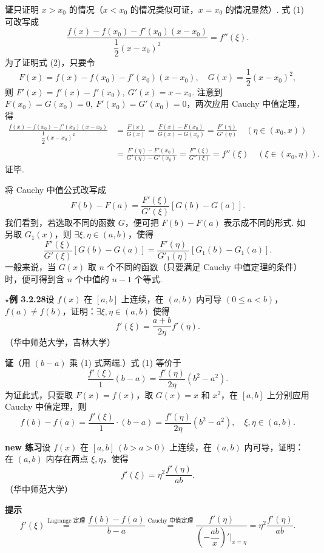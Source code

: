 \documentclass[UTF8, 12pt, fontset=fandol, oneside]{ctexart}
\begin{document}
\noindent\textbf{证}\quad 只证明 $x>x_0$ 的情况（$x<x_0$ 的情况类似可证，$x=x_0$ 的情况显然）. 式 (1) 可改写成
\begin{equation}
  \frac{f(x)-f(x_0)-f'(x_0)(x-x_0)}
  {\dfrac12(x-x_0)^2}=f''(\xi).
\tag{2}
\end{equation}
为了证明式 (2)，只要令
\[
  F(x)=f(x)-f(x_0)-f'(x_0)(x-x_0),\quad
  G(x)=\frac12(x-x_0)^2,
\]
则 $F'(x)=f'(x)-f'(x_0),\ G'(x)=x-x_0$.
注意到 $F(x_0)=G(x_0)=0,\ F'(x_0)=G'(x_0)=0$，两次应用 Cauchy 中值定理，得
\[
\begin{aligned}
\frac{f(x)-f(x_0)-f'(x_0)(x-x_0)}
{\dfrac12(x-x_0)^2}
&=\frac{F(x)}{G(x)}
=\frac{F(x)-F(x_0)}{G(x)-G(x_0)}
=\frac{F'(\eta)}{G'(\eta)}\quad(\eta\in(x_0,x))\\
&=\frac{F'(\eta)-F'(x_0)}{G'(\eta)-G'(x_0)}
=\frac{F''(\xi)}{G''(\xi)}
=f''(\xi)\quad(\xi\in(x_0,\eta)).
\end{aligned}
\]
证毕.

将 Cauchy 中值公式改写成
\[
  F(b)-F(a)=\frac{F'(\xi)}{G'(\xi)}[G(b)-G(a)].
\]
我们看到，若选取不同的函数 $G$，便可把 $F(b)-F(a)$ 表示成不同的形式. 如另取 $G_1(x)$，则 $\exists\xi,\eta\in(a,b)$，使得
\[
  \frac{F'(\xi)}{G'(\xi)}[G(b)-G(a)]
  =
  \frac{F'(\eta)}{G'_1(\eta)}[G_1(b)-G_1(a)].
\]
一般来说，当 $G(x)$ 取 $n$ 个不同的函数（只要满足 Cauchy 中值定理的条件）时，便可得到含 $n$ 个中值的 $n-1$ 个等式.

\noindent\textbf{$\star$例 3.2.28}\quad 设 $f(x)$ 在 $[a,b]$ 上连续，在 $(a,b)$ 内可导 $(0\le a<b)$，$f(a)\ne f(b)$，证明：$\exists\xi,\eta\in(a,b)$ 使得
\begin{equation}
  f'(\xi)=\frac{a+b}{2\eta}f'(\eta).
\tag{1}
\end{equation}
（华中师范大学，吉林大学）

\noindent\textbf{证}\quad （用 $(b-a)$ 乘 (1) 式两端.）式 (1) 等价于
\begin{equation}
  \frac{f'(\xi)}1(b-a)=\frac{f'(\eta)}{2\eta}(b^2-a^2).
\tag{2}
\end{equation}
为证此式，只要取 $F(x)=f(x)$，取 $G(x)=x$ 和 $x^2$，在 $[a,b]$ 上分别应用 Cauchy 中值定理，则
\[
  f(b)-f(a)=\frac{f'(\xi)}1\cdot(b-a)=\frac{f'(\eta)}{2\eta}(b^2-a^2),\quad \xi,\eta\in(a,b).
\]

\noindent\textbf{new 练习}\quad 设 $f(x)$ 在 $[a,b]\ (b>a>0)$ 上连续，在 $(a,b)$ 内可导，证明：在 $(a,b)$ 内存在两点 $\xi,\eta$，使得
\[
  f'(\xi)=\eta^2\frac{f'(\eta)}{ab}.
\]
（华中师范大学）

\noindent\textbf{提示}\quad
\[
  f'(\xi)\stackrel{\text{Lagrange 定理}}{=}\frac{f(b)-f(a)}{b-a}
  \stackrel{\text{Cauchy 中值定理}}{=}
  \frac{f'(\eta)}{\left(-\dfrac{ab}{x}\right)'\big|_{x=\eta}}
  =\eta^2\frac{f'(\eta)}{ab}.
\]
\end{document}
